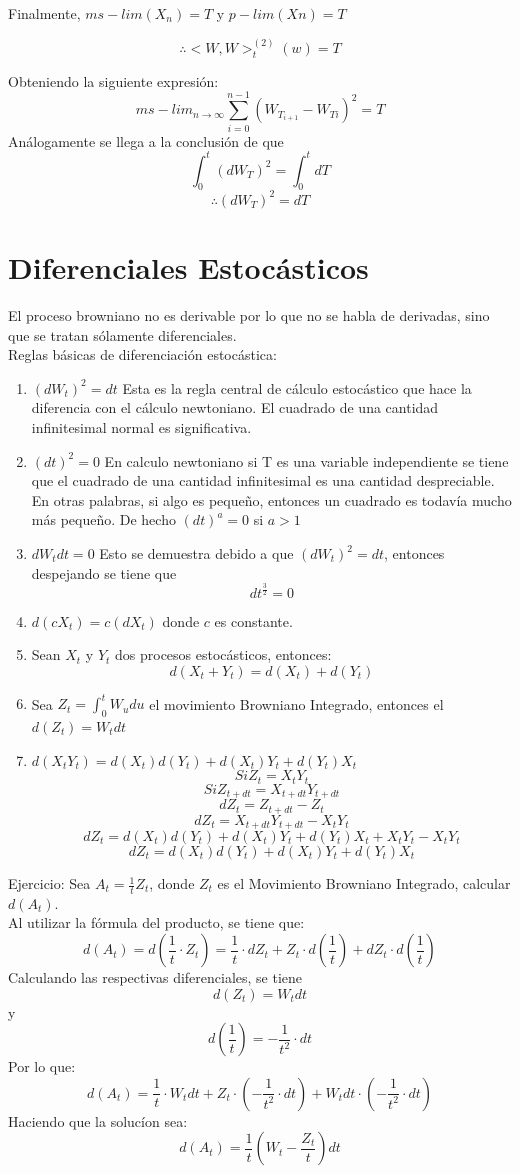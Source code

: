 \documentclass[11pt,fleqn]{book} %
\numberwithin{equation}{section} %
\numberwithin{figure}{section} %
\numberwithin{table}{section} %
\begin{document}
Finalmente, $ms-lim(X_n)=T$ y $p-lim(Xn)=T$

$$\therefore <W,W>^{(2)}_{t}(w)=T $$

Obteniendo la siguiente expresión:
$$ms-lim_{n \rightarrow \infty} \sum^{n-1}_{i=0}(W_{T_{i+1}}-W_{T{i}})^2 =T$$
Análogamente se llega a la conclusión de que
$$\int^{t}_{0}(dW_T)^2=\int^{t}_{0}dT $$ 
$$\therefore (dW_T)^2=dT$$
\section{Diferenciales Estocásticos}
El proceso browniano no es derivable por lo que no se habla de derivadas, sino que se tratan sólamente diferenciales.
\ \\%
Reglas básicas de diferenciación estocástica:
\begin{enumerate}
    \item $(dW_t)^2=dt$ Esta es la regla central de cálculo estocástico que hace la diferencia con el cálculo newtoniano. El cuadrado de una cantidad infinitesimal normal es significativa.
    \item $(dt)^2=0$ En calculo newtoniano si T es una variable independiente se tiene que el cuadrado de una cantidad infinitesimal es una cantidad despreciable. En otras palabras, si algo es pequeño, entonces un cuadrado es todavía mucho más pequeño. De hecho $(dt)^a=0$ si $a>1$
    \item $dW_t dt=0$ Esto se demuestra debido a que $(dW_t)^2=dt$, entonces despejando se tiene que 
    $$dt^{\frac{3}{2}}=0$$
    \item $d(c X_{t}) = c(dX_{t}) $ donde $c$ es constante.
    \item Sean $X_{t}$ y $Y_{t}$ dos procesos estocásticos, entonces:
    $$ d(X_{t} + Y_{t}) = d(X_{t}) + d(Y_{t})  $$
    
    \item Sea $Z_{t} = \int_{0}^{t} W_{u} du$ el movimiento Browniano Integrado, entonces el $d(Z_{t}) = W_{t}dt$
    \item $d(X_{t}Y_{t}) = d(X_{t})d(Y_{t}) + d(X_{t})Y_{t} + d(Y_{t})X_{t}$
    $$ Si Z_{t} = X_{t}Y_{t} $$
    $$ Si Z_{t+dt} = X_{t+dt}Y_{t+dt} $$
    $$ dZ_{t} = Z_{t+dt} - Z_{t} $$
    $$ dZ_{t} = X_{t+dt}Y_{t+dt} - X_{t}Y_{t} $$
    $$ dZ_{t} = d(X_{t})d(Y_{t}) + d(X_{t})Y_{t} + d(Y_{t})X_{t} + X_{t}Y_{t} - X_{t}Y_{t}  $$
    $$ dZ_{t} = d(X_{t})d(Y_{t}) + d(X_{t})Y_{t} + d(Y_{t})X_{t}$$
\end{enumerate}
Ejercicio: Sea $A_t=\frac{1}{t}Z_t$, donde $Z_t$ es el Movimiento Browniano Integrado, calcular $ d(A_{t})$.
\ \\%
Al utilizar la fórmula del producto, se tiene que:
$$ d(A_{t}) = d\left( \frac{1}{t} \cdot Z_t  \right) = \frac{1}{t} \cdot dZ_t + Z_t \cdot d\left( \frac{1}{t}  \right) +  dZ_t \cdot d\left( \frac{1}{t}  \right)$$
Calculando las respectivas diferenciales, se tiene 
$$ d(Z_{t}) = W_{t} dt $$
y
$$ d\left( \frac{1}{t}  \right) = -\frac{1}{t^2} \cdot dt  $$
Por lo que:
$$ d(A_{t}) = \frac{1}{t} \cdot W_t dt + Z_t \cdot \left(  -\frac{1}{t^2} \cdot dt \right) + W_t dt \cdot \left(  -\frac{1}{t^2} \cdot dt \right)$$
Haciendo que la solucíon sea:
$$ d(A_{t}) = \frac{1}{t} \left(W_{t} -\frac{Z_{t}}{t} \right) dt$$
\end{document}
